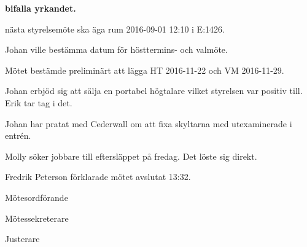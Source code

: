 \documentclass[10pt]{article}
\def\mo{Fredrik Peterson}
\def\ms{Erik Månsson}
\def\ji{Stephanie Mirsky}
\begin{document}
\begin{paragrafer}
\textbf{\Mba bifalla yrkandet.}

\Mba nästa styrelsemöte ska äga rum 2016-09-01 12:10 i E:1426.

\Ibfu

Johan ville bestämma datum för hösttermins- och valmöte.

Mötet bestämde preliminärt att lägga HT 2016-11-22 och VM 2016-11-29.

Johan erbjöd sig att sälja en portabel högtalare vilket styrelsen var positiv till. Erik tar tag i det.

Johan har pratat med Cederwall om att fixa skyltarna med utexaminerade i entrén.

Molly söker jobbare till eftersläppet på fredag. Det löste sig direkt.

{\mo} förklarade mötet avslutat 13:32.

\end{paragrafer}

\newpage
\hidesignfoot
\begin{signatures}{3}
\signature{\mo}{Mötesordförande}
\signature{\ms}{Mötessekreterare}
\signature{\ji}{Justerare}
\end{signatures}
\end{document}
